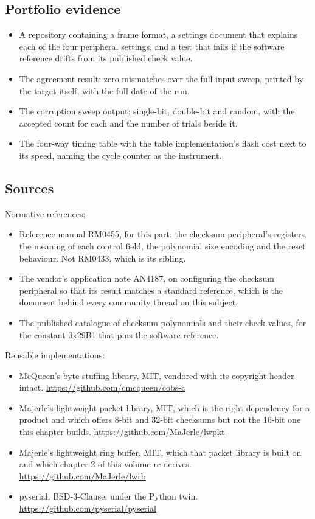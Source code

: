 \subsection*{Portfolio evidence}

\begin{itemize}
\item A repository containing a frame format, a settings document that explains
each of the four peripheral settings, and a test that fails if the software
reference drifts from its published check value.
\item The agreement result: zero mismatches over the full input sweep, printed
by the target itself, with the full date of the run.
\item The corruption sweep output: single-bit, double-bit and random, with the
accepted count for each and the number of trials beside it.
\item The four-way timing table with the table implementation's flash cost next
to its speed, naming the cycle counter as the instrument.
\end{itemize}

\subsection*{Sources}

Normative references:
\begin{itemize}
\item Reference manual RM0455, for this part: the checksum peripheral's
registers, the meaning of each control field, the polynomial size encoding and
the reset behaviour. Not RM0433, which is its sibling.
\item The vendor's application note AN4187, on configuring the checksum
peripheral so that its result matches a standard reference, which is the
document behind every community thread on this subject.
\item The published catalogue of checksum polynomials and their check values,
for the constant 0x29B1 that pins the software reference.
\end{itemize}

Reusable implementations:
\begin{itemize}
\item McQueen's byte stuffing library, MIT, vendored with its copyright header
intact.\newline
\url{https://github.com/cmcqueen/cobs-c}
\item Majerle's lightweight packet library, MIT, which is the right dependency
for a product and which offers 8-bit and 32-bit checksums but not the 16-bit one
this chapter builds.\newline
\url{https://github.com/MaJerle/lwpkt}
\item Majerle's lightweight ring buffer, MIT, which that packet library is built
on and which chapter 2 of this volume re-derives.\newline
\url{https://github.com/MaJerle/lwrb}
\item pyserial, BSD-3-Clause, under the Python twin.\newline
\url{https://github.com/pyserial/pyserial}
\end{itemize}
